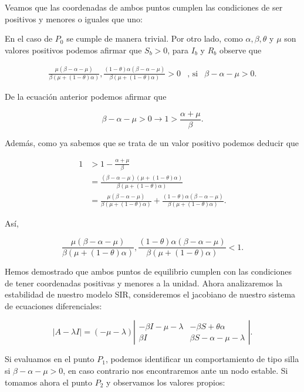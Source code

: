 Veamos que las coordenadas de ambos puntos cumplen las condiciones de ser positivos y menores o iguales que uno: 

En el caso de $P_0$ se cumple de manera trivial. Por otro lado, como $\alpha,\beta,\theta$ y $\mu$ son valores positivos podemos afirmar que $S_b>0$, para $I_b$ y $R_b$ observe que 

$$\begin{array}{ccc}
\frac{\mu(\beta-\alpha-\mu)}{\beta(\mu+(1-\theta)\alpha)},\frac{(1-\theta)\alpha(\beta-\alpha-\mu)}{\beta(\mu+(1-\theta)\alpha)}>0 & \text{, si} & \beta-\alpha-\mu>0.
\end{array}$$

De la ecuación anterior podemos afirmar que 

$$\beta-\alpha-\mu>0\longrightarrow1>\frac{\alpha+\mu}{\beta}.$$

Además, como ya sabemos que se trata de un valor positivo podemos deducir que 

\begin{align*}
1&>1-\frac{\alpha+\mu}{\beta} \\
&= \frac{(\beta-\alpha-\mu)(\mu+(1-\theta)\alpha)}{\beta(\mu+(1-\theta)\alpha)}\\
&= \frac{\mu(\beta-\alpha-\mu)}{\beta(\mu+(1-\theta)\alpha)}+\frac{(1-\theta)\alpha(\beta-\alpha-\mu)}{\beta(\mu+(1-\theta)\alpha)}.
\end{align*}

Así,

$$\frac{\mu(\beta-\alpha-\mu)}{\beta(\mu+(1-\theta)\alpha)},\frac{(1-\theta)\alpha(\beta-\alpha-\mu)}{\beta(\mu+(1-\theta)\alpha)}<1.$$

Hemos demostrado que ambos puntos de equilibrio cumplen con las condiciones de tener coordenadas positivas y menores a la unidad. Ahora analizaremos la estabilidad de nuestro modelo SIR, consideremos el jacobiano de nuestro sistema de ecuaciones diferenciales:

$$|A-\lambda I|=(-\mu-\lambda)
\left|\begin{array}{cc}
-\beta I-\mu-\lambda & -\beta S+\theta\alpha\\
\beta I & \beta S-\alpha-\mu -\lambda
\end{array}\right|.$$

Si evaluamos en el punto $P_1$, podemos identificar un comportamiento de tipo silla si $\beta-\alpha-\mu>0$, en caso contrario nos encontraremos ante un nodo estable. Si tomamos ahora el punto $P_2$ y observamos los valores propios:

